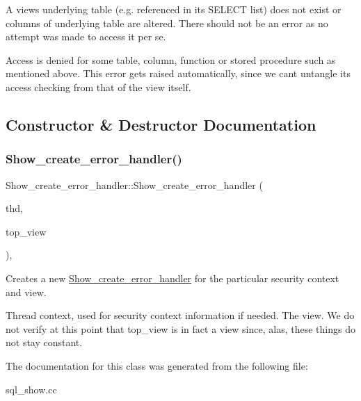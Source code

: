 \begin{DoxyItemize}
\item A view\textquotesingle{}s underlying table (e.\+g. referenced in its S\+E\+L\+E\+CT list) does not exist or columns of underlying table are altered. There should not be an error as no attempt was made to access it per se.
\item Access is denied for some table, column, function or stored procedure such as mentioned above. This error gets raised automatically, since we can\textquotesingle{}t untangle its access checking from that of the view itself. 
\end{DoxyItemize}

\subsection{Constructor \& Destructor Documentation}
\mbox{\label{classShow__create__error__handler_a441315b69de4be2dd6e80159282db7d9}} 
\subsubsection{\texorpdfstring{Show\+\_\+create\+\_\+error\+\_\+handler()}{Show\_create\_error\_handler()}}
{\footnotesize\ttfamily Show\+\_\+create\+\_\+error\+\_\+handler\+::\+Show\+\_\+create\+\_\+error\+\_\+handler (\begin{DoxyParamCaption}\item[{T\+HD $\ast$}]{thd,  }\item[{\mbox{\hyperlink{structTABLE__LIST}{T\+A\+B\+L\+E\+\_\+\+L\+I\+ST}} $\ast$}]{top\+\_\+view }\end{DoxyParamCaption})\hspace{0.3cm}{\ttfamily [inline]}, {\ttfamily [explicit]}}

Creates a new \mbox{\hyperlink{classShow__create__error__handler}{Show\+\_\+create\+\_\+error\+\_\+handler}} for the particular security context and view.

Thread context, used for security context information if needed.  The view. We do not verify at this point that top\+\_\+view is in fact a view since, alas, these things do not stay constant. 

The documentation for this class was generated from the following file\+:\begin{DoxyCompactItemize}
\item 
sql\+\_\+show.\+cc\end{DoxyCompactItemize}
